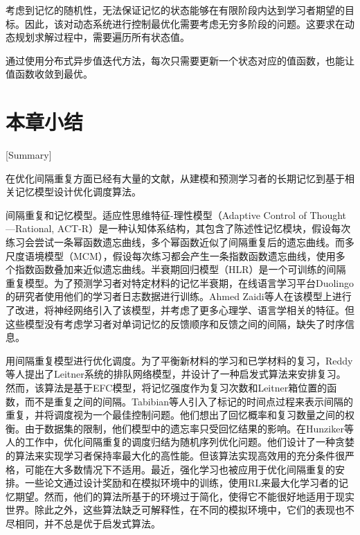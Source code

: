 考虑到记忆的随机性，无法保证记忆的状态能够在有限阶段内达到学习者期望的目标。因此，该对动态系统进行控制最优化需要考虑无穷多阶段的问题。这要求在动态规划求解过程中，需要遍历所有状态值。

通过使用分布式异步值迭代方法，每次只需要更新一个状态对应的值函数，也能让值函数收敛到最优\cite[197-200]{bertsekasReinforcementLearningOptimal2019}。

\section{本章小结}[Summary]

在优化间隔重复方面已经有大量的文献，从建模和预测学习者的长期记忆到基于相关记忆模型设计优化调度算法。

间隔重复和记忆模型。适应性思维特征-理性模型（Adaptive Control of Thought—Rational, ACT-R）\cite{andersonIntegratedTheoryMind2004}是一种认知体系结构，其包含了陈述性记忆模块，假设每次练习会尝试一条幂函数遗忘曲线，多个幂函数近似了间隔重复后的遗忘曲线。而多尺度语境模型（MCM）\cite{pashlerPredictingOptimalSpacing2009}，假设每次练习都会产生一条指数函数遗忘曲线，使用多个指数函数叠加来近似遗忘曲线。半衰期回归模型（HLR）\cite{settlesTrainableSpacedRepetition2016}是一个可训练的间隔重复模型。为了预测学习者对特定材料的记忆半衰期，在线语言学习平台Duolingo的研究者使用他们的学习者日志数据进行训练。Ahmed Zaidi等人\cite{zaidiAdaptiveForgettingCurves2020}在该模型上进行了改进，将神经网络引入了该模型，并考虑了更多心理学、语言学相关的特征。但这些模型没有考虑学习者对单词记忆的反馈顺序和反馈之间的间隔，缺失了时序信息。

用间隔重复模型进行优化调度。为了平衡新材料的学习和已学材料的复习，Reddy等人\cite{reddyUnboundedHumanLearning2016}提出了Leitner系统\cite{leitnerLerntManLeben1974}的排队网络模型，并设计了一种启发式算法来安排复习。然而，该算法是基于EFC模型\cite{reddyUnboundedHumanLearning2016}，将记忆强度作为复习次数和Leitner箱位置的函数，而不是重复之间的间隔。Tabibian等人\cite{tabibianEnhancingHumanLearning2019}引入了标记的时间点过程来表示间隔的重复，并将调度视为一个最佳控制问题。他们想出了回忆概率和复习数量之间的权衡。由于数据集的限制，他们模型中的遗忘率只受回忆结果的影响。在Hunziker等人\cite{hunzikerTeachingMultipleConcepts2019}的工作中，优化间隔重复的调度归结为随机序列优化问题。他们设计了一种贪婪的算法来实现学习者保持率最大化的高性能。但该算法实现高效用的充分条件很严格，可能在大多数情况下不适用。最近，强化学习也被应用于优化间隔重复的安排。一些论文\cite{reddyAcceleratingHumanLearning2017,upadhyayDeepReinforcementLearning2018,sinhaUsingDeepReinforcement2019,yangTADSLearningTimeaware2020}通过设计奖励和在模拟环境中的训练，使用RL来最大化学习者的记忆期望。然而，他们的算法所基于的环境过于简化，使得它不能很好地适用于现实世界。除此之外，这些算法缺乏可解释性，在不同的模拟环境中，它们的表现也不尽相同，并不总是优于启发式算法。

